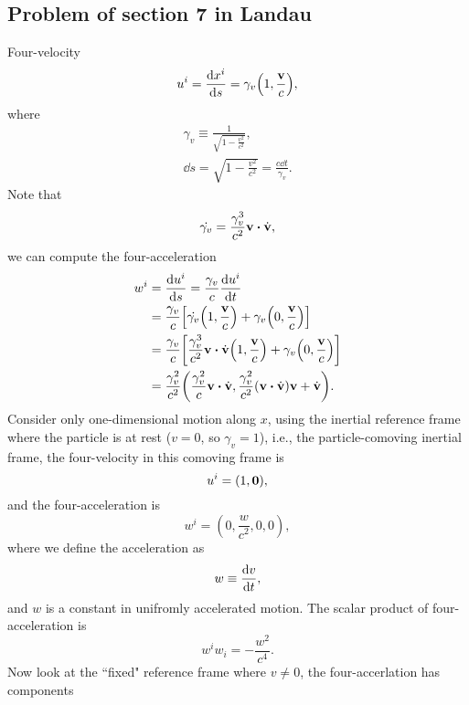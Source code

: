 \documentclass[10pt]{article}
\begin{document}
\subsection{Problem of section 7 in Landau}
Four-velocity
\begin{equation}
	u^i = \dv{x^i}{s} = \gamma_v \qty(1, \frac{\vb{v}}{c}),
\end{equation}
where
\begin{gather*}
	\gamma_v \equiv \frac{1}{\sqrt{1-\frac{v^2}{c^2}}}, \\
	\dd{s} = \sqrt{1-\frac{v^2}{c^2}} = \frac{c \dd{t}}{\gamma_v}.
\end{gather*}
Note that
\begin{equation}
	\dot{\gamma_v} = \frac{\gamma_v^3}{c^2}\vb{v}\vdot \dot{\vb{v}},
\end{equation}
we can compute the four-acceleration
\begin{align*}
	w^i &= \dv{u^i}{s} = \frac{\gamma_v}{c} \dv{u^i}{t} \\
	&= \frac{\gamma_v}{c} \qty[\dot{\gamma_v}\qty(1,\frac{\vb{v}}{c}) + \gamma_v \qty(0,\frac{\vb{v}}{c})] \\
	&= \frac{\gamma_v}{c} \qty[\frac{\gamma_v^3}{c^2} \vb{v}\vdot \dot{\vb{v}}\qty(1,\frac{\vb{v}}{c}) + \gamma_v \qty(0,\frac{\vb{v}}{c})] \\
	&= \frac{\gamma_v^2}{c^2} \qty(\frac{\gamma_v^2}{c} \vb{v} \vdot \dot{\vb{v}}, \frac{\gamma_v^2}{c^2} (\vb{v} \vdot \dot{\vb{v}}) \vb{v} + \dot{\vb{v}}).
\end{align*}
Consider only one-dimensional motion along $x$, using the inertial reference frame where the particle is at rest ($v=0$, so $\gamma_v = 1$), i.e., the particle-comoving inertial frame, the four-velocity in this comoving frame is
\begin{equation}
	u^i = (1, \vb{0}),
\end{equation}
and the four-acceleration is
\begin{equation}
	w^i = (0, \frac{w}{c^2}, 0, 0),
\end{equation}
where we define the acceleration as
\begin{equation}
	w \equiv \dv{v}{t},
\end{equation}
and $w$ is a constant in unifromly accelerated motion. The scalar product of four-acceleration is
\begin{equation}
	w^i w_i = -\frac{w^2}{c^4}.
\end{equation}
Now look at the ``fixed" reference frame where $v \neq 0$, the four-accerlation has components
\end{document}
